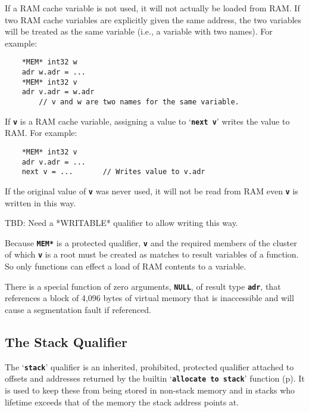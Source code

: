 \documentclass[12pt]{article}
\makeatletter
\newcommand{\TT}[1]{{\tt \bfseries #1}}
\newcommand{\ttkey}[1]{\TT{#1}\index{#1@{\tt #1}}}
\newcommand{\pagref}[1]{p\pageref{#1}}
\newenvironment{indpar}[1][0.3in]%
	{\begin{list}{}%
		     {\setlength{\itemsep}{0in}%
		      \setlength{\topsep}{0in}%
		      \setlength{\parsep}{1ex}%
		      \setlength{\labelwidth}{#1}%
		      \setlength{\leftmargin}{#1}%
		      \addtolength{\leftmargin}{\labelsep}}%
	 \item}%
	{\end{list}}
\makeatother
\begin{document}
If a RAM cache variable is not used, it will not actually be loaded
from RAM.  If two RAM cache variables are explicitly given the
same address, the two variables will be treated as the same variable
(i.e., a variable with two names).  For example:

\begin{indpar}\begin{verbatim}
    *MEM* int32 w
    adr w.adr = ...
    *MEM* int32 v
    adr v.adr = w.adr
        // v and w are two names for the same variable.
\end{verbatim}\end{indpar}

If \TT{v} is a RAM cache variable, assigning a value to `\TT{next v}'
writes the value to RAM.  For example:

\begin{indpar}\begin{verbatim}
    *MEM* int32 v
    adr v.adr = ...
    next v = ...       // Writes value to v.adr
\end{verbatim}\end{indpar}

If the original value of \TT{v} was never used, it will not be
read from RAM even \TT{v} is written in this way.

TBD: Need a *WRITABLE* qualifier to allow writing this way.

Because \TT{*MEM*} is a protected qualifier, \TT{v} and the required
members of the cluster of which \TT{v} is a root
must be created as matches to result variables of a function.
So only functions can effect a load of RAM contents to a variable.

There is a special function of zero arguments, \TT{NULL}, of result
type \TT{adr}, that
references a block of 4,096 bytes of virtual memory that is
inaccessible and will cause a segmentation fault if referenced.


\subsection{The Stack Qualifier}
\label{THE-STACK-QUALIFIER}

The `\ttkey{stack}' qualifier is an inherited, prohibited,
protected qualifier
attached to offsets and addresses
returned by the builtin `\TT{allocate to stack}'
function (\pagref{ALLOCATE-TO-STACK}).
It is used to keep these from being stored in
non-stack memory and in stacks who lifetime exceeds that of the
memory the stack address points at.
\end{document}
